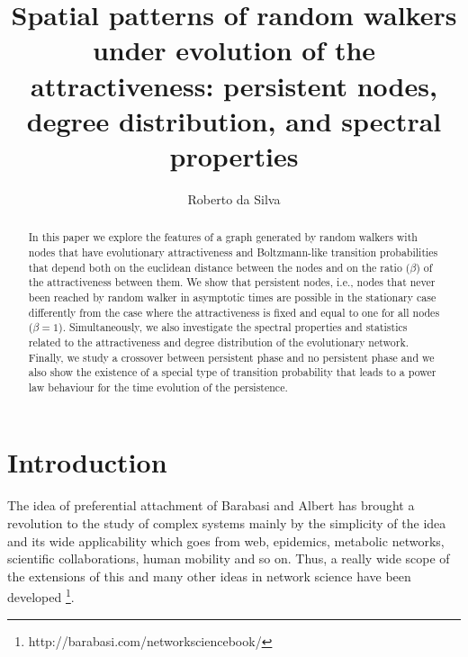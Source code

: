 \documentclass[3p, 11pt]{elsarticle}
\begin{document}

\begin{frontmatter}

\title{Spatial patterns of random walkers under evolution of the 
attractiveness: persistent nodes, degree distribution, and spectral properties}

\author{Roberto da Silva} 

\address{Institute of Physics, Federal University of Rio Grande do Sul,
Av. Bento Gon\c{c}alves, 9500, Porto Alegre, 91501-970, RS, Brazil
{\normalsize{E-mail:rdasilva@if.ufrgs.br}}}


\begin{abstract}

In this paper we explore the features of a graph generated by random walkers
with nodes that have evolutionary attractiveness and Boltzmann-like
transition probabilities that depend both on the euclidean distance between
the nodes and on the ratio ($\beta $) of the attractiveness between them. We
show that persistent nodes, i.e., nodes that never been reached by random
walker in asymptotic times are possible in the stationary case differently
from the case where the attractiveness is fixed and equal to one for all
nodes ($\beta =1$). Simultaneously, we also investigate the spectral
properties and statistics related to the attractiveness and degree
distribution of the evolutionary network. Finally, we study a crossover
between persistent phase and no persistent phase and we also show the
existence of a special type of transition probability that leads to a power
law behaviour for the time evolution of the persistence.
\end{abstract}

\end{frontmatter}


\tableofcontents


\setlength{\baselineskip}{0.7cm}

\section{Introduction}

\label{Sec:Introduction}

The idea of preferential attachment of Barabasi and Albert \cite%
{Barabasi1999,Albert2002} has brought a revolution to the study of complex
systems mainly by the simplicity of the idea and its wide applicability
which goes from web, epidemics, metabolic networks, scientific
collaborations, human mobility and so on. Thus, a really wide scope of the
extensions of this and many other ideas in network science have been
developed \footnote{%
http://barabasi.com/networksciencebook/}.
\end{document}
